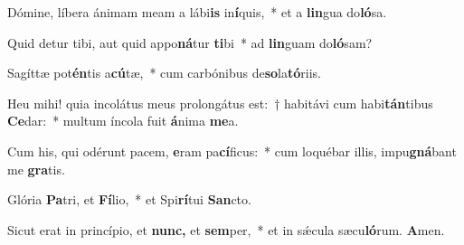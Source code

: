 \item Dómine, líbera ánimam meam a lábi\textbf{is} in\textbf{í}quis,~* et a \textbf{lin}gua do\textbf{ló}sa.
\item Quid detur tibi, aut quid appo\textbf{ná}tur \textbf{ti}bi~* ad \textbf{lin}guam do\textbf{ló}sam?
\item Sagíttæ pot\textbf{én}tis a\textbf{cú}tæ,~* cum carbónibus de\textbf{so}la\textbf{tó}riis.
\item Heu mihi! quia incolátus meus prolongátus est:~† habitávi cum habi\textbf{tán}tibus \textbf{Ce}dar:~* multum íncola fuit \textbf{á}nima \textbf{me}a.
\item Cum his, qui odérunt pacem, \textbf{e}ram pa\textbf{cí}ficus:~* cum loquébar illis, impu\textbf{gná}bant me \textbf{gra}tis.
\item Glória \textbf{Pa}tri, et \textbf{Fí}lio,~* et Spi\textbf{rí}tui \textbf{San}cto.
\item Sicut erat in princípio, et \textbf{nunc,} et \textbf{sem}per,~* et in sǽcula sæcu\textbf{ló}rum. \textbf{A}men.
